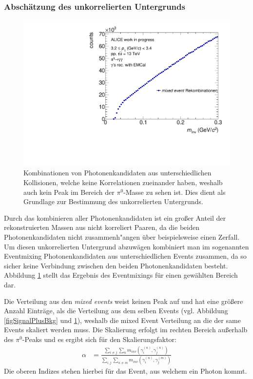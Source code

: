 \documentclass[]{article}
\begin{document}
	\subsubsection{Absch{\"a}tzung des unkorrelierten Untergrunds}
	\label{sssec:num3}
	
	\begin{figure}[tbp]
		\centering
		\includegraphics[width=.7\linewidth]{hUncorrBkg.pdf}
		\caption{Kombinationen von Photonenkandidaten aus unterschiedlichen Kollisionen, welche keine Korrelationen zueinander haben, weshalb auch kein Peak im Bereich der $\pi^{0}$-Masse zu sehen ist. Dies dient als Grundlage zur Bestimmung des unkorrelierten Untergrunds.}
		\label{figUncorrBkg}
	\end{figure}
	
	Durch das kombinieren aller Photonenkandidaten ist ein gro{\ss}er Anteil der rekonstruierten Massen aus nicht korreliert Paaren, da die beiden Photonenkandidaten nicht zusammenh{"a}ngen {\"u}ber beispielsweise einen Zerfall. Um diesen unkorrelierten Untergrund abzuw{\"a}gen kombiniert man im sogenannten Eventmixing Photonenkandidaten aus unterschiedlichen Events zusammen, da so sicher keine Verbindung zwischen den beiden Photonenkandidaten besteht. Abbildung \ref{figUncorrBkg} stellt das Ergebnis des Eventmixings f{\"u}r einen gew{\"a}hlten Bereich dar.
	
	Die Verteilung aus den {\it mixed events} weist keinen Peak auf und hat eine gr{\"o}{\ss}ere Anzahl Eintr{\"a}ge, als die Verteilung aus dem selben Events (vgl. Abbildung \ref{figSignalPlusBkg} und \ref{figUncorrBkg}), weshalb die mixed Event Verteilung an die der same Events skaliert werden muss. Die Skalierung erfolgt im rechten Bereich au{\ss}erhalb des $\pi^{0}$-Peaks und es ergibt sich f{\"u}r den Skalierungsfaktor:
	\begin{align}
	\label{eqBackSkalierung}
	\alpha &= \frac{\sum_{i \neq j}\sum_{n}m_{inv}\left( \gamma^{(n)}_{i},\gamma^{(n)}_{j}\right) }{\sum_{i,j}\sum_{n \neq m}m_{inv}\left( \gamma^{(n)}_{i},\gamma^{(m)}_{j}\right) }
	\end{align}
	Die oberen Indizes stehen hierbei f{\"u}r das Event, aus welchem ein Photon kommt.\newline
	
\end{document}
